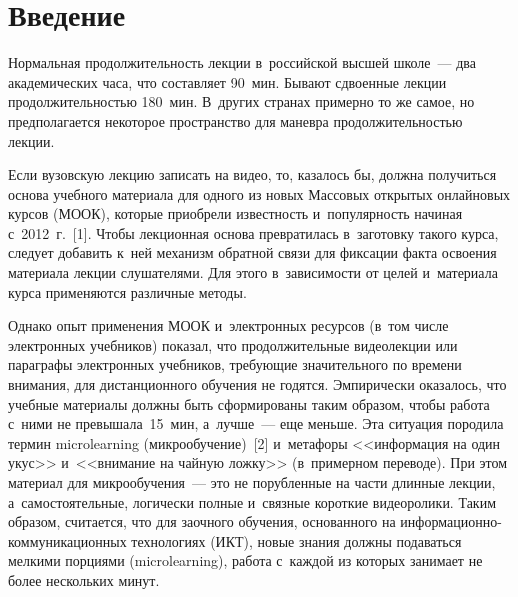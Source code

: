   
  
  \vspace*{3pt}



\thispagestyle{headings}

\begin{multicols}{2}

\label{st\stat}
  
\section{Введение}

  Нормальная продолжительность лекции в~российской высшей школе~--- два 
академических часа, что составляет 90~мин. Бывают сдвоенные лекции 
продолжительностью 180~мин. В~других странах примерно то же самое, но 
предполагается некоторое пространство для маневра продолжительностью 
лекции.
  
  Если вузовскую лекцию записать на видео, то, казалось бы, должна 
получиться основа учебного материала для одного из новых Массовых 
открытых онлайновых курсов (МООК), которые приобрели известность 
и~популярность начиная с~2012~г.~[1]. Чтобы лекционная основа 
превратилась в~заготовку такого курса, следует добавить к~ней механизм 
обратной связи для фиксации факта освоения материала лекции слушателями. 
Для этого в~зависимости от целей и~материала курса применяются различные 
методы.
  
  Однако опыт применения МООК и~электронных ресурсов (в~том числе 
электронных учебников) показал, что продолжительные видеолекции или 
параграфы электронных учебников, тре\-бу\-ющие значительного по времени 
внимания, для дистанционного обучения не годятся. Эмпирически оказалось, 
что учебные материалы должны быть сформированы таким образом, чтобы 
работа с~ними не превышала~15~мин, а~лучше~--- еще меньше. Эта ситуация 
породила термин microlearning (мик\-ро\-обуче\-ние)~[2] и~метафоры 
<<информация на один укус>> и~<<внимание на чайную ложку>> 
(в~примерном переводе). При этом материал для микрообучения~--- это не 
порубленные на части длинные лекции, а~самостоятельные, логически полные 
и~связные короткие видеоролики. Таким образом, считается, что для заочного 
обучения, основанного на ин\-фор\-ма\-ци\-он\-но-ком\-му\-ни\-ка\-ци\-он\-ных 
технологиях (ИКТ), новые знания должны подаваться мелкими порциями 
(microlearning), работа с~каждой из которых занимает не более нескольких 
минут. 
  

\end{multicols}
